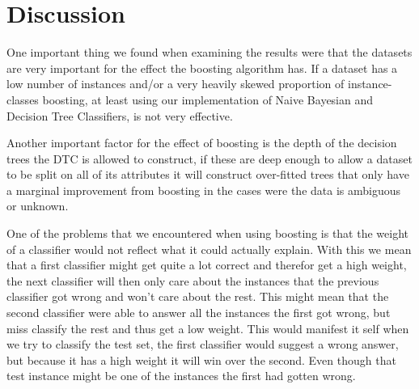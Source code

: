 \section{Discussion}\label{discussion}
One important thing we found when examining the results were that the datasets 
are very important for the effect the boosting algorithm has. If a dataset has 
a low number of instances and/or a very heavily skewed proportion of 
instance-classes boosting, at least using our implementation of Naive Bayesian 
and Decision Tree Classifiers, is not very effective.

Another important factor for the effect of boosting is the depth of the 
decision trees the DTC is allowed to construct, if these are deep enough to 
allow a dataset to be split on all of its attributes it will construct 
over-fitted trees that only have a marginal improvement from boosting in the 
cases were the data is ambiguous or unknown.

One of the problems that we encountered when using boosting is that the weight
of a classifier would not reflect what it could actually explain. With this we
mean that a first classifier might get quite a lot correct and therefor get
a high weight, the next classifier will then only care about the instances that
the previous classifier got wrong and won't care about the rest. This might mean that
the second classifier were able to answer all the instances the first got wrong,
but miss classify the rest and thus get a low weight. This would manifest it self
when we try to classify the test set, the first classifier would suggest a wrong
answer, but because it has a high weight it will win over the second. Even though
that test instance might be one of the instances the first had gotten wrong.

